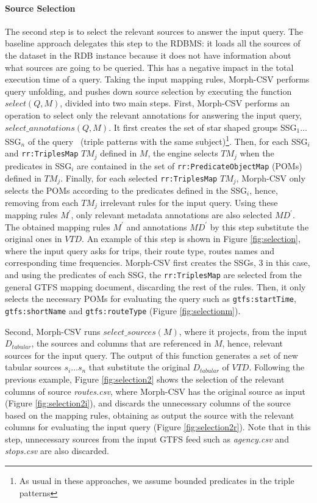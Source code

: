 \paragraph{Source Selection}
The second step is to select the relevant sources to answer the input query. The baseline approach delegates this step to the RDBMS: it loads all the sources of the dataset in the RDB instance because it does not have information about what sources are going to be queried. This has a negative impact in the total execution time of a query. Taking the input mapping rules, Morph-CSV performs query unfolding, and pushes down source selection by executing the function $select(Q,M)$, divided into two main steps. First, Morph-CSV performs an operation to select only the relevant annotations for answering the input query, $select\_annotations(Q,M)$. It first creates the set of star shaped groups SSG$_1\ldots $SSG$_n$ of the query~\citep{vidal2010efficient} (triple patterns with the same subject)\footnote{As usual in these approaches, we assume bounded predicates in the triple patterns}. Then, for each SSG$_i$ and \texttt{rr:TriplesMap} $TM_j$ defined in $M$, the engine selects $TM_j$ when the predicates in SSG$_i$ are contained in the set of \texttt{rr:PredicateObjectMap} (POMs) defined in $TM_j$. Finally, for each selected \texttt{rr:TriplesMap} $TM_j$, Morph-CSV only selects the POMs according to the predicates defined in the SSG$_i$, hence, removing from each $TM_j$ irrelevant rules for the input query. Using these mapping rules $M^{'}$, only relevant metadata annotations are also selected $MD^{'}$. The obtained mapping rules $M^{'}$ and annotations $MD^{'}$ by this step substitute the original ones in $VTD$. An example of this step is shown in Figure \ref{fig:selection}, where the input query asks for trips, their route type, routes names and corresponding time frequencies. Morph-CSV first creates the SSGs, 3 in this case, and using the predicates of each SSG, the \texttt{rr:TriplesMap} are selected from the general GTFS mapping document, discarding the rest of the rules. Then, it only selects the necessary POMs for evaluating the query such as \texttt{gtfs:startTime}, \texttt{gtfs:shortName} and \texttt{gtfs:routeType} (Figure \ref{fig:selectionm}).

Second, Morph-CSV runs $select\_sources(M)$, where it projects, from the input $D_{tabular}$, the sources and columns that are referenced in $M$, hence, relevant sources for the input query. The output of this function generates a set of new tabular sources $s_i\ldots s_n$ that substitute the original $D_{tabular}$ of $VTD$. Following the previous example, Figure \ref{fig:selection2} shows the selection of the relevant columns of  source \textit{routes.csv}, where Morph-CSV has the original source as  input  (Figure \ref{fig:selection2i}), and discards the unnecessary columns of the source based on the mapping rules, obtaining as output the source with the relevant columns for evaluating the input query (Figure \ref{fig:selection2r}). Note that in this step, unnecessary sources from the input GTFS feed such as \textit{agency.csv} and \textit{stops.csv} are also discarded.

